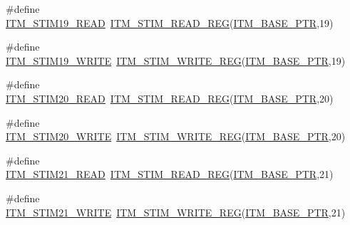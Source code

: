 \begin{DoxyCompactItemize}
\item 
\#define \hyperlink{group___i_t_m___register___accessor___macros_gaae6a230f21e1fb36ab999e662677ac65}{I\+T\+M\+\_\+\+S\+T\+I\+M19\+\_\+\+R\+E\+AD}~\hyperlink{group___i_t_m___register___accessor___macros_ga5009882336aadcd4f37b45cf3395c450}{I\+T\+M\+\_\+\+S\+T\+I\+M\+\_\+\+R\+E\+A\+D\+\_\+\+R\+EG}(\hyperlink{group___i_t_m___peripheral_gafaddee8fe8b6a898d4e5edc43ee0d703}{I\+T\+M\+\_\+\+B\+A\+S\+E\+\_\+\+P\+TR},19)
\item 
\#define \hyperlink{group___i_t_m___register___accessor___macros_ga0dcaa81a5a092538e5d2184087988886}{I\+T\+M\+\_\+\+S\+T\+I\+M19\+\_\+\+W\+R\+I\+TE}~\hyperlink{group___i_t_m___register___accessor___macros_ga049ca92a4e78e77c19af81e51aa73f1c}{I\+T\+M\+\_\+\+S\+T\+I\+M\+\_\+\+W\+R\+I\+T\+E\+\_\+\+R\+EG}(\hyperlink{group___i_t_m___peripheral_gafaddee8fe8b6a898d4e5edc43ee0d703}{I\+T\+M\+\_\+\+B\+A\+S\+E\+\_\+\+P\+TR},19)
\item 
\#define \hyperlink{group___i_t_m___register___accessor___macros_gaec08b7ed3a53bdd0c49f608929a323ed}{I\+T\+M\+\_\+\+S\+T\+I\+M20\+\_\+\+R\+E\+AD}~\hyperlink{group___i_t_m___register___accessor___macros_ga5009882336aadcd4f37b45cf3395c450}{I\+T\+M\+\_\+\+S\+T\+I\+M\+\_\+\+R\+E\+A\+D\+\_\+\+R\+EG}(\hyperlink{group___i_t_m___peripheral_gafaddee8fe8b6a898d4e5edc43ee0d703}{I\+T\+M\+\_\+\+B\+A\+S\+E\+\_\+\+P\+TR},20)
\item 
\#define \hyperlink{group___i_t_m___register___accessor___macros_ga1e109dc4eb08a82ad21ba29f64b02976}{I\+T\+M\+\_\+\+S\+T\+I\+M20\+\_\+\+W\+R\+I\+TE}~\hyperlink{group___i_t_m___register___accessor___macros_ga049ca92a4e78e77c19af81e51aa73f1c}{I\+T\+M\+\_\+\+S\+T\+I\+M\+\_\+\+W\+R\+I\+T\+E\+\_\+\+R\+EG}(\hyperlink{group___i_t_m___peripheral_gafaddee8fe8b6a898d4e5edc43ee0d703}{I\+T\+M\+\_\+\+B\+A\+S\+E\+\_\+\+P\+TR},20)
\item 
\#define \hyperlink{group___i_t_m___register___accessor___macros_ga5e2870c6c2d38a75f0477a1030fc60aa}{I\+T\+M\+\_\+\+S\+T\+I\+M21\+\_\+\+R\+E\+AD}~\hyperlink{group___i_t_m___register___accessor___macros_ga5009882336aadcd4f37b45cf3395c450}{I\+T\+M\+\_\+\+S\+T\+I\+M\+\_\+\+R\+E\+A\+D\+\_\+\+R\+EG}(\hyperlink{group___i_t_m___peripheral_gafaddee8fe8b6a898d4e5edc43ee0d703}{I\+T\+M\+\_\+\+B\+A\+S\+E\+\_\+\+P\+TR},21)
\item 
\#define \hyperlink{group___i_t_m___register___accessor___macros_gac7f186c8addcf22a51326064a6775a33}{I\+T\+M\+\_\+\+S\+T\+I\+M21\+\_\+\+W\+R\+I\+TE}~\hyperlink{group___i_t_m___register___accessor___macros_ga049ca92a4e78e77c19af81e51aa73f1c}{I\+T\+M\+\_\+\+S\+T\+I\+M\+\_\+\+W\+R\+I\+T\+E\+\_\+\+R\+EG}(\hyperlink{group___i_t_m___peripheral_gafaddee8fe8b6a898d4e5edc43ee0d703}{I\+T\+M\+\_\+\+B\+A\+S\+E\+\_\+\+P\+TR},21)

\end{DoxyCompactItemize}
